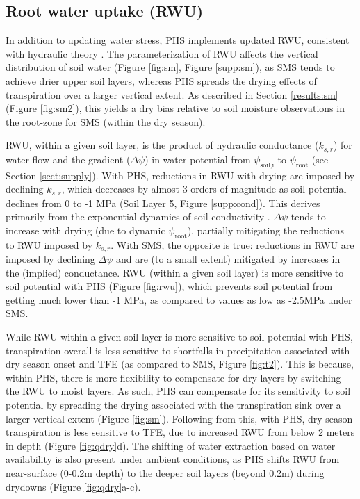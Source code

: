 \documentclass[draft,linenumbers]{agujournal}
\begin{document}
\subsection{Root water uptake (RWU)}

In addition to updating water stress, PHS implements updated RWU, consistent with hydraulic theory \citep{cai2018,warren2015}.
The parameterization of RWU affects the vertical distribution of soil water (Figure \ref{fig:sm}, Figure \ref{supp:sm}), as
SMS tends to achieve drier upper soil layers, whereas PHS spreads the drying effects of transpiration over a larger vertical extent.
As described in Section \ref{results:sm} (Figure \ref{fig:sm2}), this yields a dry bias relative to soil moisture observations in the root-zone for SMS (within the dry season).

RWU, within a given soil layer, is the product of hydraulic conductance ($k_{s,r}$) for water flow and the gradient ($\Delta\psi$) in water potential from $\psi_{\text{soil,i}}$ to $\psi_\text{root}$ (see Section \ref{sect:supply}).
With PHS, reductions in RWU with drying are imposed by declining $k_{s,r}$, which decreases by almost 3 orders of magnitude as soil potential declines from 0 to -1 MPa (Soil Layer 5, Figure \ref{supp:cond}).
This derives primarily from the exponential dynamics of soil conductivity \citep{brooks1964}.
$\Delta\psi$ tends to increase with drying (due to dynamic $\psi_{\text{root}}$), partially mitigating the reductions to RWU imposed by $k_{s,r}$.
With SMS, the opposite is true: reductions in RWU are imposed by declining $\Delta\psi$ and are (to a small extent) mitigated by increases in the (implied) conductance. 
RWU (within a given soil layer) is more sensitive to soil potential with PHS (Figure \ref{fig:rwu}), which prevents soil potential from getting much lower than -1 MPa, as compared to values as low as -2.5MPa under SMS.

While RWU within a given soil layer is more sensitive to soil potential with PHS, transpiration overall is less sensitive to shortfalls in precipitation
associated with dry season onset and TFE (as compared to SMS, Figure \ref{fig:t2}).
This is because, within PHS, there is more flexibility to compensate for dry layers by switching the RWU to moist layers.
As such, PHS can compensate for its sensitivity to soil potential by spreading the drying associated with the transpiration sink over a larger vertical extent (Figure \ref{fig:sm}).
Following from this, with PHS, dry season transpiration is less sensitive to TFE, due to increased RWU from below 2 meters in depth (Figure \ref{fig:qdry}d).
The shifting of water extraction based on water availability is also present under ambient conditions, as PHS shifts RWU from near-surface (0-0.2m depth) to the deeper soil layers (beyond 0.2m) during drydowns (Figure \ref{fig:qdry}a-c).
\end{document}
